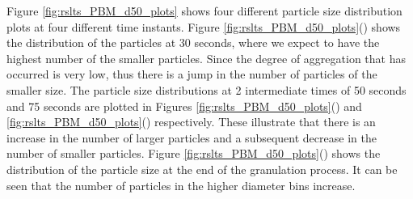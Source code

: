 \documentclass[preprint,11pt,authoryear]{elsarticle}
\begin{document}
Figure \ref{fig:rslts_PBM_d50_plots} shows four different particle size distribution plots at four 
different time instants. Figure \ref{fig:rslts_PBM_d50_plots}() shows the distribution of 
the particles at 30 seconds, where we expect to have the highest number of the smaller particles. 
Since the degree of aggregation that has occurred is very low, thus there is a jump in the number of 
particles of the smaller size. The particle size distributions at 2 intermediate times of 50 seconds and 
75 seconds are plotted in Figures \ref{fig:rslts_PBM_d50_plots}() and 
\ref{fig:rslts_PBM_d50_plots}() respectively. These illustrate that there is an increase in 
the number of larger particles  and a subsequent decrease in the number of smaller particles. 
Figure \ref{fig:rslts_PBM_d50_plots}() shows the distribution 
of the particle size at the end of the granulation process. It can be seen that the number of particles in 
the higher diameter bins increase.
\end{document}
